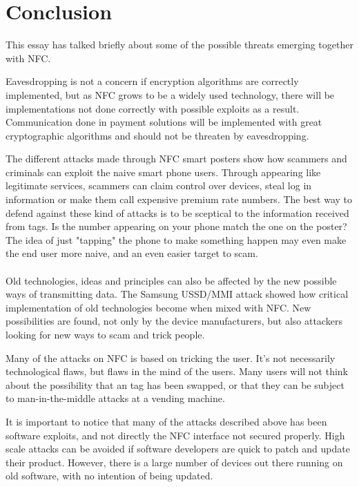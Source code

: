 \documentclass[a4paper,11pt]{article}
\begin{document}
\section{Conclusion}
This essay has talked briefly about some of the possible threats emerging together with NFC.

Eavesdropping is not a concern if encryption algorithms are correctly implemented, but as NFC grows to be a widely used technology, there will be implementations not done correctly with possible exploits as a result. Communication done in payment solutions will be implemented with great cryptographic algorithms and should not be threaten by eavesdropping.

The different attacks made through NFC smart posters show how scammers and criminals can exploit the naive smart phone users. Through appearing like legitimate services, scammers can claim control over devices, steal log in information or make them call expensive premium rate numbers. The best way to defend against these kind of attacks is to be sceptical to the information received from tags. Is the number appearing on your phone match the one on the poster? The idea of just "tapping" the phone to make something happen may even make the end user more naive, and an even easier target to scam.

\paragraph{}
Old technologies, ideas and principles can also be affected by the new possible ways of transmitting data. The Samsung USSD/MMI attack showed how critical implementation of old technologies become when mixed with NFC. New possibilities are found, not only by the device manufacturers, but also attackers looking for new ways to scam and trick people.

Many of the attacks on NFC is based on tricking the user. It's not necessarily technological flaws, but flaws in the mind of the users. Many users will not think about the possibility that an tag has been swapped, or that they can be subject to man-in-the-middle attacks at a vending machine.

It is important to notice that many of the attacks described above has been software exploits, and not directly the NFC interface not secured properly. High scale attacks can be avoided if software developers are quick to patch and update their product. However, there is a large number of devices out there running on old software, with no intention of being updated.
\end{document}
